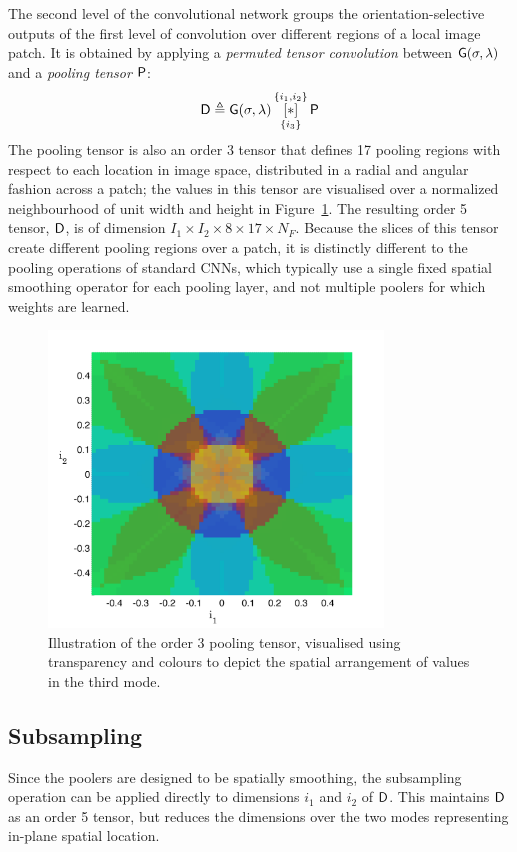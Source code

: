 The second level of the convolutional network groups the orientation-selective outputs of the first level of convolution over different regions of a local image patch. It is obtained by applying a {\it permuted tensor convolution} between $\mathsf{G}(\sigma,\lambda)$ and a {\it pooling tensor} $\mathsf{P}$:  
\begin{equation}
\mathsf{D} \triangleq \mathsf{G}(\sigma,\lambda) \, 
   \underset{\lbrace i_3 \rbrace}{\overset{\lbrace i_1,i_2\rbrace}{[ \ast ]}}\, {\mathsf{P}}
\end{equation}
The pooling tensor is also an order 3 tensor that defines 17 pooling regions with respect to each location in image space, distributed in a radial and angular fashion across a patch; the values in this tensor are visualised over a normalized neighbourhood of unit width and height in Figure~\ref{fig:PoolingTensor}. The resulting order 5 tensor, $\mathsf{D}$, is of dimension $I_1\times I_2 \times 8 \times 17 \times N_F$. Because the slices of this tensor create different pooling regions over a patch, it is distinctly different to the pooling operations of standard CNNs, which typically use a single fixed spatial smoothing operator for each pooling layer, and not multiple poolers for which weights are learned. \\

\begin{figure}[!t]
\centering
\includegraphics[width=3.5in]{gfx/Chapter05/PoolingTensorRender.png}
\caption{Illustration of the order 3 pooling tensor, visualised using transparency and colours to depict the spatial arrangement of values in the third mode. }
\label{fig:PoolingTensor}
\end{figure}

\subsection{Subsampling}
Since the poolers are designed to be spatially smoothing, the subsampling operation can be applied directly to dimensions $i_1$ and $i_2$ of $\mathsf{D}$. This maintains $\mathsf{D}$ as an order 5 tensor, but reduces the dimensions over the two modes representing in-plane spatial location. 


